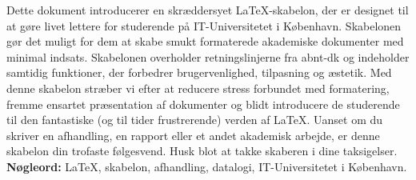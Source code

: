 \documentclass[pnumromarab,noindentfirst]{abnt}
\begin{document}
\begin{abstract}
This document introduces a custom \LaTeX~template designed to simplify students' lives at IT University of Copenhagen, empowering them to create beautifully formatted academic documents with minimal effort. The template encapsulates the \acrfull{abnt} formatting guidelines while incorporating features that enhance usability, adaptability, and visual appeal. By providing this template, we aim to reduce formatting-related stress, encourage consistent document presentation, and gently guide students into the wonderful (and occasionally maddening) world of \LaTeX. Whether you are writing a thesis, report, or any academic work, this template is your steadfast companion. Just don't forget to thank the creator in your acknowledgments.\\
\textbf{Keywords:} \LaTeX, template, thesis, computer science, IT University of Copenhagen.
\end{abstract}

\begin{resume}
Dette dokument introducerer en skr{\ae}ddersyet \LaTeX-skabelon, der er designet til at g{\o}re livet lettere for studerende p{\aa} IT-Universitetet i K{\o}benhavn. Skabelonen g{\o}r det muligt for dem at skabe smukt formaterede akademiske dokumenter med minimal indsats. Skabelonen overholder retningslinjerne fra \acrfull{abnt-dk} og indeholder samtidig funktioner, der forbedrer brugervenlighed, tilpasning og {\ae}stetik. Med denne skabelon str{\ae}ber vi efter at reducere stress forbundet med formatering, fremme ensartet pr{\ae}sentation af dokumenter og blidt introducere de studerende til den fantastiske (og til tider frustrerende) verden af \LaTeX. Uanset om du skriver en afhandling, en rapport eller et andet akademisk arbejde, er denne skabelon din trofaste f{\o}lgesvend. Husk blot at takke skaberen i dine taksigelser.\\
\textbf{N{\o}gleord:} \LaTeX, skabelon, afhandling, datalogi, IT-Universitetet i K{\o}benhavn.
\end{resume}


\listoffigures                                            %
\listoftables                                             %
\printglossary[title=List of Acronyms,type=\acronymtype]  %
\contents                                                 %
\end{document}
